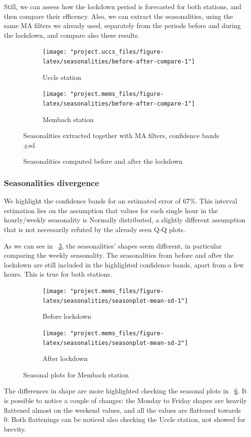 \documentclass[12pt]{article}
\begin{document}
Still, we can assess how the lockdown period is forecasted for both stations, and then compare their efficency. Also, we can extract the seasonalities, using the same MA filters we already used, separately from the periods before and during the lockdown, and compare also these results.

\begin{figure}[h]
	\begin{subfigure}{.5\linewidth}
		\texttt{[image: "project.uccs\_files/figure-latex/seasonalities/before-after-compare-1"]}
		\caption{Uccle station}
		\label{fig:season.lockdown:uccs}
	\end{subfigure}
	\begin{subfigure}{.5\linewidth}
		\texttt{[image: "project.mems\_files/figure-latex/seasonalities/before-after-compare-1"]}
		\caption{Membach station}
		\label{fig:season.lockdown:mems}
	\end{subfigure}
	\caption{Seasonalities computed before and after the lockdown}{\centering\small Seasonalities extracted together with MA filters, confidence bands $\pm\mathrm{sd}$\\}
	\label{fig:season.lockdown}
\end{figure}
%
\subsubsection{Seasonalities divergence}
We highlight the confidence bands for an estimated error of 67\%. This interval estimation lies on the assumption that values for each single hour in the hourly/weekly seasonality is Normally distributed, a slightly different assumption that is not necessarily refuted by the already seen Q-Q plots.

As we can see in \figurename~\ref{fig:season.lockdown}, the seasonalities' shapes seem different, in particular comparing the weekly seasonality. The seasonalities from before and after the lockdown are still included in the highlighted confidence bands, apart from a few hours. This is true for both stations.

\begin{figure}[h]
	\begin{subfigure}{.5\linewidth}
		\texttt{[image: "project.mems\_files/figure-latex/seasonalities/seasonplot-mean-sd-1"]}
		\caption{Before lockdown}
		\label{fig:season.lockdown:msb:mems}
	\end{subfigure}
	\begin{subfigure}{.5\linewidth}
		\texttt{[image: "project.mems\_files/figure-latex/seasonalities/seasonplot-mean-sd-2"]}
		\caption{After lockdown}
		\label{fig:season.lockdown:msa:mems}
	\end{subfigure}
	\caption{Seasonal plots for Membach station}
	\label{fig:season.lockdown:ms:mems}
\end{figure}
%
The differences in shape are more highlighted checking the seasonal plots \cite{hyndman2018forecasting} in \figurename~\ref{fig:season.lockdown:ms:mems}. It is possible to notice a couple of changes: the Monday to Friday shapes are heavily flattened almost on the weekend values, and all the values are flattened towards 0. Both flattenings can be noticed also checking the Uccle station, not showed for brevity.
\end{document}
